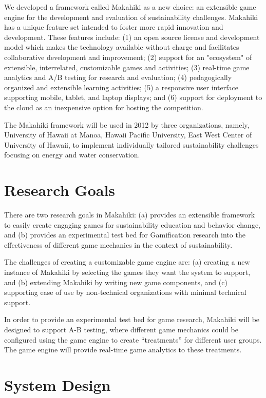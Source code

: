 \documentclass[11pt]{article}
\begin{document}
We developed a framework called Makahiki as a new choice: an extensible game engine for the development and evaluation of sustainability challenges. Makahiki has a unique feature set intended to foster more rapid innovation and development. These features include: (1) an open source license and development model which makes the technology available without charge and facilitates collaborative development and improvement; (2) support for an "ecosystem" of extensible, interrelated, customizable games and activities; (3) real-time game analytics and A/B testing for research and evaluation; (4) pedagogically organized and extensible learning activities; (5) a responsive user interface supporting mobile, tablet, and laptop displays; and (6) support for deployment to the cloud as an inexpensive option for hosting the competition.

The Makahiki framework will be used in 2012 by three organizations, namely, University of Hawaii at Manoa, Hawaii Pacific University, East West Center of University of Hawaii, to implement individually tailored sustainability challenges focusing on energy and water conservation. 

\section{Research Goals}

There are two research goals in Makahiki: (a) provides an extensible framework to easily create engaging games for sustainability education and behavior change, and (b) provides an experimental test bed for Gamification research into the effectiveness of different game mechanics in the context of sustainability.

The challenges of creating a customizable game engine are:  (a) creating a new instance of Makahiki by selecting the games they want the system to support, and (b) extending Makahiki by writing new game components, and (c) supporting ease of use by non-technical organizations with minimal technical support.

In order to provide an experimental test bed for game research, Makahiki will be designed to support A-B testing, where different game mechanics could be configured using the game engine to create ``treatments'' for different user groups. The game engine will provide real-time game analytics to these treatments.

\section{System Design}
\end{document}
